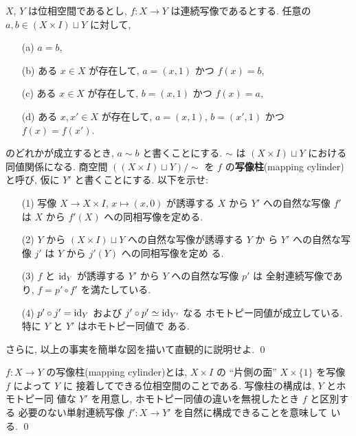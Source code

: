 \documentclass[12pt,twoside]{jarticle}
\begin{document}
\begin{question}
  \label{q:mapping-cylinder}
  $X$, $Y$ は位相空間であるとし, $f : X \to Y$ は連続写像であるとする.
  任意の $a,b\in(X\times I)\sqcup Y$ に対して,
  \begin{itemize}
  \item[(a)] $a=b$,
  \item[(b)] ある $x\in X$ が存在して, $a=(x,1)$ かつ $f(x)=b$,
  \item[(c)] ある $x\in X$ が存在して, $b=(x,1)$ かつ $f(x)=a$,
  \item[(d)] ある $x,x'\in X$ が存在して, $a=(x,1)$, $b=(x',1)$
   かつ $f(x)=f(x')$.
  \end{itemize}
  のどれかが成立するとき, $a\sim b$ と書くことにする. %
  $\sim$ は $(X\times I)\sqcup Y$ における同値関係になる. 商空間 %
  $((X\times I)\sqcup Y)/{\sim}$ を $f$ の{\bf 写像柱}(mapping
  cylinder)と呼び, 仮に $Y'$ と書くことにする.  %
  以下を示せ:
  \begin{enumerate}
  \item[(1)] 写像 $X \to X \times I$, $x \mapsto (x,0)$ が誘導する $X$ から
    $Y'$ への自然な写像 $f'$ は $X$ から $f'(X)$ への同相写像を定める.
  \item[(2)] $Y$ から $(X\times I)\sqcup Y$ への自然な写像が誘導する $Y$ か
    ら $Y'$ への自然な写像 $j'$ は $Y$ から $j'(Y)$ への同相写像を定め
    る. 
  \item[(3)] $f$ と $\mathop{\mathrm{id}}\nolimits_Y$ が誘導する $Y'$ から $Y$ への自然な写像 $p'$ は
    全射連続写像であり, $f = p' \circ f'$ を満たしている.
  \item[(4)] $p'\circ j' = \mathop{\mathrm{id}}\nolimits_Y$ および $j'\circ p' \simeq \mathop{\mathrm{id}}\nolimits_{Y'}$ なる
    ホモトピー同値が成立している. 特に $Y$ と $Y'$ はホモトピー同値で
    ある. 
  \end{enumerate}
  さらに, 以上の事実を簡単な図を描いて直観的に説明せよ. \qed
\end{question}

\begin{guide}
$f : X \to Y$ の写像柱(mapping cylinder)とは, %
$X\times I$ の ``片側の面'' $X\times\{1\}$ を写像 $f$ によって $Y$ に
接着してできる位相空間のことである. 写像柱の構成は, $Y$ とホモトピー同
値な $Y'$ を用意し, ホモトピー同値の違いを無視したとき $f$ と区別する
必要のない単射連続写像 $f' : X\to Y'$ を自然に構成できることを意味して
いる.
\qed 
\end{guide}
\end{document}
